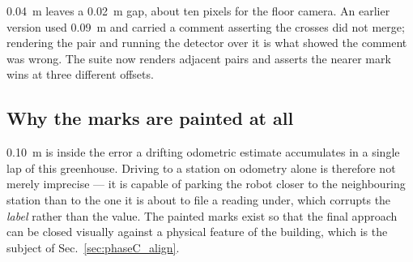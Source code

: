 \SI{0.04}{m} leaves a \SI{0.02}{m} gap, about ten pixels for the floor
camera. An earlier version used \SI{0.09}{m} and carried a comment
asserting the crosses did not merge; rendering the pair and running the
detector over it is what showed the comment was wrong. The suite now
renders adjacent pairs and asserts the nearer mark wins at three
different offsets.

\subsection{Why the marks are painted at all}

\SI{0.10}{m} is inside the error a drifting odometric estimate
accumulates in a single lap of this greenhouse. Driving to a station on
odometry alone is therefore not merely imprecise --- it is capable of
parking the robot closer to the neighbouring station than to the one it
is about to file a reading under, which corrupts the \emph{label} rather
than the value. The painted marks exist so that the final approach can
be closed visually against a physical feature of the building, which is
the subject of Sec.~\ref{sec:phaseC_align}.
